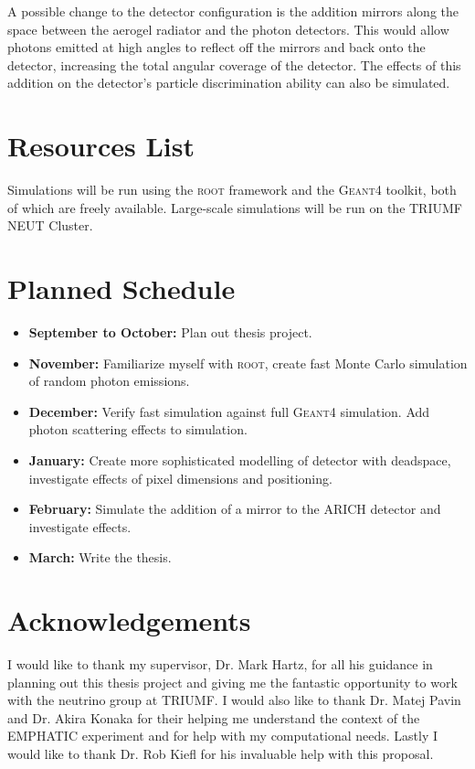 A possible change to the detector configuration is the addition mirrors along the space between the aerogel radiator and the photon detectors. This would allow photons emitted at high angles to reflect off the mirrors and back onto the detector, increasing the total angular coverage of the detector. The effects of this addition on the detector's particle discrimination ability can also be simulated.




\section{Resources List}
Simulations will be run using the \textsc{root} framework and the \textsc{Geant4} toolkit, both of which are freely available. Large-scale simulations will be run on the TRIUMF NEUT Cluster.


\section{Planned Schedule}

\begin{itemize}
  \item \textbf{September to October:} Plan out thesis project.
  \item \textbf{November:} Familiarize myself with \textsc{root}, create fast Monte Carlo simulation of random photon emissions.
  \item \textbf{December:} Verify fast simulation against full \textsc{Geant4} simulation. Add photon scattering effects to simulation.
  \item \textbf{January:} Create more sophisticated modelling of detector with deadspace, investigate effects of pixel dimensions and positioning.
  \item \textbf{February:} Simulate the addition of a mirror to the ARICH detector and investigate effects.
  \item \textbf{March:} Write the thesis.

\end{itemize}


\section{Acknowledgements}
I would like to thank my supervisor, Dr. Mark Hartz, for all his guidance in planning out this thesis project and giving me the fantastic opportunity to work with the neutrino group at TRIUMF. I would also like to thank Dr. Matej Pavin and Dr. Akira Konaka for their helping me understand the context of the EMPHATIC experiment and for help with my computational needs. Lastly I would like to thank Dr. Rob Kiefl for his invaluable help with this proposal.


\endinput

Any text after an \endinput is ignored.
You could put scraps here or things in progress.
